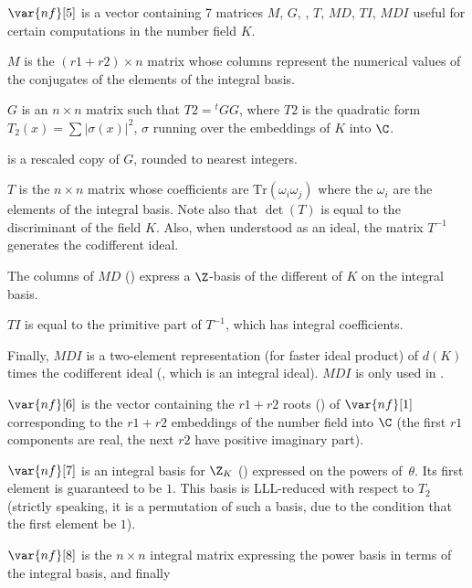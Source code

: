 $\var{nf}[5]$ is a vector containing 7 matrices $M$, $G$, , $T$,
$MD$, $TI$, $MDI$ useful for certain computations in the number field $K$.

\quad\item $M$ is the $(r1+r2)\times n$ matrix whose columns represent
the numerical values of the conjugates of the elements of the integral
basis.

\quad\item $G$ is an $n\times n$ matrix such that $T2 = {}^t G G$,
where $T2$ is the quadratic form $T_2(x) = \sum |\sigma(x)|^2$, $\sigma$
running over the embeddings of $K$ into $\C$.

\quad\item {} is a rescaled copy of $G$, rounded to nearest
integers.

\quad\item $T$ is the $n\times n$ matrix whose coefficients are
$\text{Tr}(\omega_i\omega_j)$ where the $\omega_i$ are the elements of the
integral basis. Note also that $\det(T)$ is equal to the discriminant of the
field $K$. Also, when understood as an ideal, the matrix $T^{-1}$
generates the codifferent ideal.

\quad\item The columns of $MD$ () express a $\Z$-basis
of the different of $K$ on the integral basis.

\quad\item $TI$ is equal to the primitive part of $T^{-1}$, which has integral
coefficients.

\quad\item Finally, $MDI$ is a two-element representation (for faster
ideal product) of $d(K)$ times the codifferent ideal
(, which is an integral ideal). $MDI$
is only used in .

$\var{nf}[6]$ is the vector containing the $r1+r2$ roots
() of $\var{nf}[1]$ corresponding to the $r1+r2$
embeddings of the number field into $\C$ (the first $r1$ components are real,
the next $r2$ have positive imaginary part).

$\var{nf}[7]$ is an integral basis for $\Z_K$ () expressed
on the powers of~$\theta$. Its first element is guaranteed to be $1$. This
basis is LLL-reduced with respect to $T_2$ (strictly speaking, it is a
permutation of such a basis, due to the condition that the first element be
$1$).

$\var{nf}[8]$ is the $n\times n$ integral matrix expressing the power
basis in terms of the integral basis, and finally

